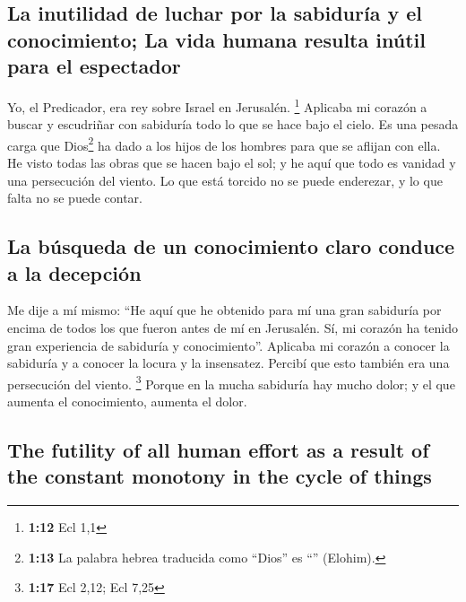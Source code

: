 \begin{paracol}{2}
{\subsection{La inutilidad de luchar por la sabiduría y el conocimiento;
La vida humana resulta inútil para el
espectador}\label{la-inutilidad-de-luchar-por-la-sabiduruxeda-y-el-conocimiento-la-vida-humana-resulta-inuxfatil-para-el-espectador}}

 Yo, el Predicador, era rey sobre Israel en Jerusalén.
\footnote{\textbf{1:12} Ecl 1,1}  Aplicaba mi corazón a
buscar y escudriñar con sabiduría todo lo que se hace bajo el cielo. Es
una pesada carga que Dios\footnote{\textbf{1:13} La palabra hebrea
  traducida como ``Dios'' es ``'' (Elohim).} ha dado a los
hijos de los hombres para que se aflijan con ella.  He
visto todas las obras que se hacen bajo el sol; y he aquí que todo es
vanidad y una persecución del viento.  Lo que está
torcido no se puede enderezar, y lo que falta no se puede contar.

\hypertarget{la-buxfasqueda-de-un-conocimiento-claro-conduce-a-la-decepciuxf3n}{%
\subsection{La búsqueda de un conocimiento claro conduce a la
decepción}\label{la-buxfasqueda-de-un-conocimiento-claro-conduce-a-la-decepciuxf3n}}

 Me dije a mí mismo: ``He aquí que he obtenido para mí
una gran sabiduría por encima de todos los que fueron antes de mí en
Jerusalén. Sí, mi corazón ha tenido gran experiencia de sabiduría y
conocimiento''.  Aplicaba mi corazón a conocer la
sabiduría y a conocer la locura y la insensatez. Percibí que esto
también era una persecución del viento. \footnote{\textbf{1:17} Ecl
  2,12; Ecl 7,25}  Porque en la mucha sabiduría hay mucho
dolor; y el que aumenta el conocimiento, aumenta el dolor.

\switchcolumn
\begin{otherlanguage}{english}

\hypertarget{the-futility-of-all-human-effort-as-a-result-of-the-constant-monotony-in-the-cycle-of-things}{%
\subsection{The futility of all human effort as a result of the constant
monotony in the cycle of
things}\label{the-futility-of-all-human-effort-as-a-result-of-the-constant-monotony-in-the-cycle-of-things}}


\end{otherlanguage}
\end{paracol}
